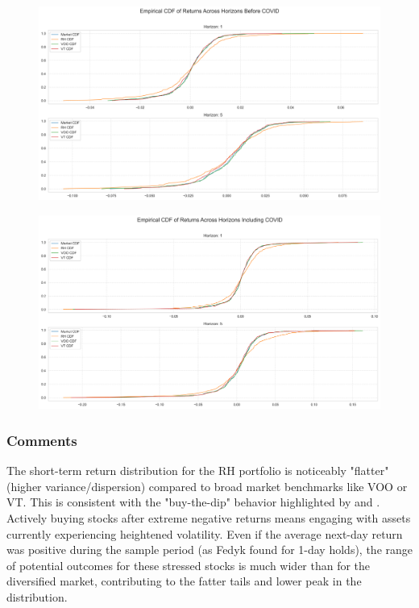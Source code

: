 \begin{figure}[H]
    \centering
    \includegraphics[width=1\linewidth]{../images/cdfs_before_1_5.png}
\end{figure}
\begin{figure}[H]
    \centering
    \includegraphics[width=1\linewidth]{../images/cdfs_including_1_5.png}
\end{figure}

\subsubsection{Comments}

The short-term return distribution for the RH portfolio is noticeably "flatter" (higher variance/dispersion) compared to broad market benchmarks like VOO or VT. 
This is consistent with the "buy-the-dip" behavior highlighted by \cite{Fedyk2024} and \cite{Ardia2023Fast}. 
Actively buying stocks after extreme negative returns means engaging with assets currently experiencing heightened volatility. Even if the average next-day return was positive during the sample period (as Fedyk found for 1-day holds), 
the range of potential outcomes for these stressed stocks is much wider than for the diversified market, contributing to the fatter tails and lower peak in the distribution.

